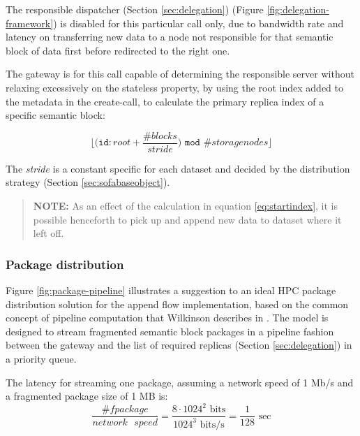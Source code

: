 The responsible dispatcher (Section \ref{sec:delegation}) (Figure \ref{fig:delegation-framework}) is disabled for this particular call only, due to bandwidth rate and latency on transferring new data to a node not responsible for that semantic block of data first before redirected to the right one.

The gateway is for this call capable of determining the responsible server without relaxing excessively on the stateless property, by using the root index added to the metadata in the create-call, to calculate the primary replica index of a specific semantic block:

\vspace*{2mm}
\begin{equation} \label{eq:startindex}
	\Big\lfloor\Big(\texttt{id}:root + \dfrac{\texttt{\#}blocks}{stride}\Big) \texttt{ mod } \texttt{\#}storagenodes\Big\rfloor
\end{equation}

The \textit{stride} is a constant specific for each dataset and decided by the distribution strategy (Section \ref{sec:sofabaseobject}).

\begin{quotation}
	{\sffamily\textbf{NOTE:}} As an effect of the calculation in equation \ref{eq:startindex}, it is possible henceforth to pick up and append new data to dataset where it left off.
\end{quotation}

\subsubsection*{Package distribution}
Figure \ref{fig:package-pipeline} illustrates a suggestion to an ideal HPC package distribution solution for the append flow implementation, based on the common concept of pipeline computation that Wilkinson \etal describes in \cite{Wilkinson:1998:PPT:289352}. The model is designed to stream fragmented semantic block packages in a pipeline fashion between the gateway and the list of required replicas (Section \ref{sec:delegation}) in a priority queue.
\newline

The latency for streaming one package, assuming a network speed of 1 Mb/s and a fragmented package size of 1 MB is:
\begin{equation}
	\dfrac{\texttt{\#}fpackage}{network\text{ }speed} = \dfrac{8\cdot 1024^2 \text{ bits}}{1024^3 \text{ bits/s}} = \dfrac{1}{128} \text{ sec}
\end{equation}

